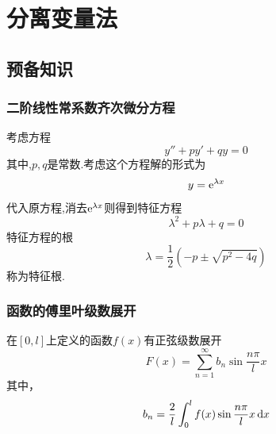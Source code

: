 \chapter{分离变量法}
\thispagestyle{empty}
\section{预备知识}
\subsection{二阶线性常系数齐次微分方程}
\tdefination[特征根与与特征方程]
考虑方程
\begin{equation}
	y''+py'+qy=0
\end{equation}
其中,$p,q$是常数.考虑这个方程解的形式为
\begin{equation*}
	y={\rm{e}}^{\lambda x}
\end{equation*}
代入原方程,消去${\rm{e}}^{\lambda x}$则得到特征方程
\begin{equation}
	\lambda^2+p\lambda+q=0
\end{equation}
特征方程的根
\begin{equation}
	\lambda=\frac{1}{2}(-p\pm\sqrt{p^2-4q})
\end{equation}
称为特征根.
\jg

\theorem[二阶线性常系数齐次微分方程的通解]
\begin{table}[!htb]
	\centering
	\renewcommand{\arraystretch}{1}
	\caption{二阶线性常系数齐次微分方程的通解}
	\renewcommand{\arraystretch}{1}
	\label{二阶线性常系数齐次微分方程的通解}
\end{table} 

\subsection{函数的傅里叶级数展开}

\ttheorem[函数的正弦级数展开]
在$[0,l]$上定义的函数$f(x)$有正弦级数展开
\begin{equation}
	F(x) = \sum_{n = 1}^{\infty} b_n \sin \dfrac{n \pi}{l} x
\end{equation}
其中，
\begin{equation}
	b_n = \dfrac{2}{l} \int_{0}^{l} f(x)\sin \dfrac{n \pi}{l} x \,{\rm{d}} x
\end{equation}

